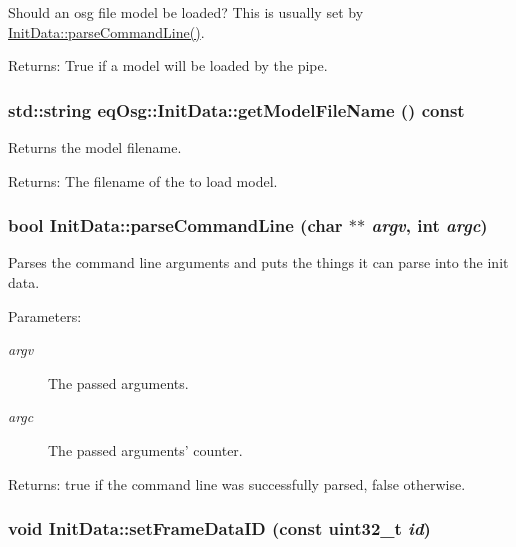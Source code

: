 Should an osg file model be loaded? This is usually set by \hyperlink{a00011_911e15d0bc1d4e427ad574a9b9e0fff9}{InitData::parseCommandLine()}. 

\begin{Desc}
\item[Returns:]True if a model will be loaded by the pipe. \end{Desc}
\hypertarget{a00011_b5f311698f1dd969d0a968fb06929426}{
\subsubsection[{getModelFileName}]{\setlength{\rightskip}{0pt plus 5cm}std::string eqOsg::InitData::getModelFileName () const}}
\label{a00011_b5f311698f1dd969d0a968fb06929426}


Returns the model filename. 

\begin{Desc}
\item[Returns:]The filename of the to load model. \end{Desc}
\hypertarget{a00011_911e15d0bc1d4e427ad574a9b9e0fff9}{
\subsubsection[{parseCommandLine}]{\setlength{\rightskip}{0pt plus 5cm}bool InitData::parseCommandLine (char $\ast$$\ast$ {\em argv}, \/  int {\em argc})}}
\label{a00011_911e15d0bc1d4e427ad574a9b9e0fff9}


Parses the command line arguments and puts the things it can parse into the init data. 

\begin{Desc}
\item[Parameters:]
\begin{description}
\item[{\em argv}]The passed arguments. \item[{\em argc}]The passed arguments' counter. \end{description}
\end{Desc}
\begin{Desc}
\item[Returns:]true if the command line was successfully parsed, false otherwise. \end{Desc}
\hypertarget{a00011_784dbe6a89945a5311143ca91b01c224}{
\subsubsection[{setFrameDataID}]{\setlength{\rightskip}{0pt plus 5cm}void InitData::setFrameDataID (const uint32\_\-t {\em id})}}
\label{a00011_784dbe6a89945a5311143ca91b01c224}


